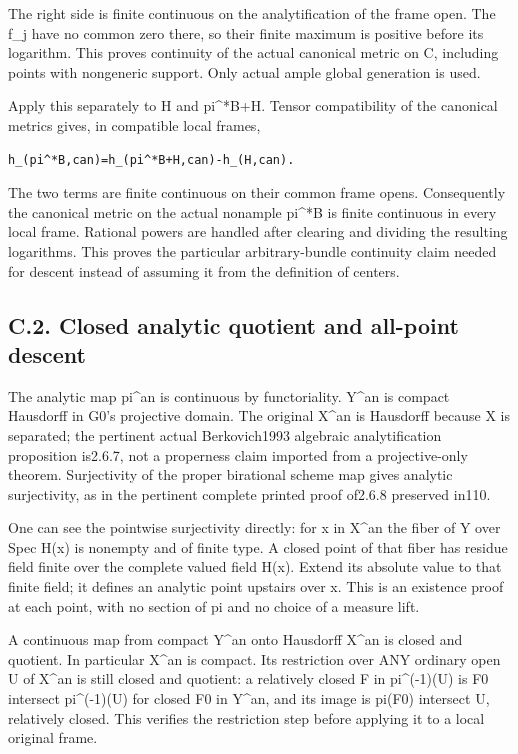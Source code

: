 \documentclass[
  10pt,
]{article}
\begin{document}
The right side is finite continuous on the analytification of the frame
open. The f\_j have no common zero there, so their finite maximum is
positive before its logarithm. This proves continuity of the actual
canonical metric on C, including points with nongeneric support. Only
actual ample global generation is used.

Apply this separately to H and pi\^{}*B+H. Tensor compatibility of the
canonical metrics gives, in compatible local frames,

\begin{verbatim}
h_(pi^*B,can)=h_(pi^*B+H,can)-h_(H,can).
\end{verbatim}

The two terms are finite continuous on their common frame opens.
Consequently the canonical metric on the actual nonample pi\^{}*B is
finite continuous in every local frame. Rational powers are handled
after clearing and dividing the resulting logarithms. This proves the
particular arbitrary-bundle continuity claim needed for descent instead
of assuming it from the definition of centers.

\subsection{C.2. Closed analytic quotient and all-point
descent}\label{c.2.-closed-analytic-quotient-and-all-point-descent}

The analytic map pi\^{}an is continuous by functoriality. Y\^{}an is
compact Hausdorff in G0's projective domain. The original X\^{}an is
Hausdorff because X is separated; the pertinent actual Berkovich1993
algebraic analytification proposition is2.6.7, not a properness claim
imported from a projective-only theorem. Surjectivity of the proper
birational scheme map gives analytic surjectivity, as in the pertinent
complete printed proof of2.6.8 preserved in110.

One can see the pointwise surjectivity directly: for x in X\^{}an the
fiber of Y over Spec H(x) is nonempty and of finite type. A closed point
of that fiber has residue field finite over the complete valued field
H(x). Extend its absolute value to that finite field; it defines an
analytic point upstairs over x. This is an existence proof at each
point, with no section of pi and no choice of a measure lift.

A continuous map from compact Y\^{}an onto Hausdorff X\^{}an is closed
and quotient. In particular X\^{}an is compact. Its restriction over ANY
ordinary open U of X\^{}an is still closed and quotient: a relatively
closed F in pi\^{}(-1)(U) is F0 intersect pi\^{}(-1)(U) for closed F0 in
Y\^{}an, and its image is pi(F0) intersect U, relatively closed. This
verifies the restriction step before applying it to a local original
frame.
\end{document}
